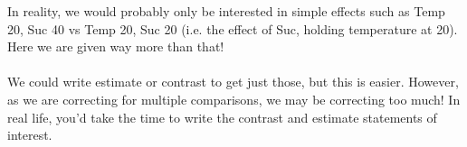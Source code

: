 In reality, we would probably only be interested in simple effects such as Temp 20, Suc 40 vs Temp 20, Suc 20 (i.e. the effect of Suc, holding temperature at 20).  Here we are given way more than that!\\~\\
We could write estimate or contrast to get just those, but this is easier.  However, as we are correcting for multiple comparisons, we may be correcting too much!  In real life, you'd take the time to write the contrast and estimate statements of interest.\\

%
%

